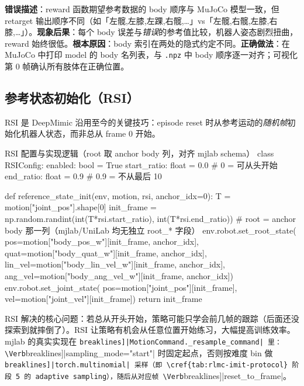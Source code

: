 \begin{pitfall}
\textbf{错误描述}：reward 函数期望参考数据的 body 顺序与 MuJoCo 模型一致，但 retarget 输出顺序不同（如「左髋,左膝,左踝,右髋,…」vs「左髋,右髋,左膝,右膝,…」）。\textbf{现象后果}：每个 body 误差与\emph{错误}的参考值比较，机器人姿态剧烈扭曲，reward 始终很低。\textbf{根本原因}：body 索引在两处的隐式约定不同。\textbf{正确做法}：在 MuJoCo 中打印 model 的 body 名列表，与 \texttt{.npz} 中 body 顺序逐一对齐；可视化第 0 帧确认所有肢体在正确位置。
\end{pitfall}

\subsection{参考状态初始化（RSI）}
\label{sec:rlmc-imit-track-rsi}

RSI 是 DeepMimic 沿用至今的关键技巧：episode reset 时从参考运动的\emph{随机帧}初始化机器人状态，而非总从 frame 0 开始。

\begin{codebox}[Python]{RSI 配置与实现逻辑（root 取 anchor body 列，对齐 mjlab schema）}
class RSIConfig:
    enabled: bool = True
    start_ratio: float = 0.0    # 0 = 可从头开始
    end_ratio: float = 0.9      # 0.9 = 不从最后 10%

def reference_state_init(env, motion, rsi, anchor_idx=0):
    T = motion["joint_pos"].shape[0]
    init_frame = np.random.randint(int(T*rsi.start_ratio), int(T*rsi.end_ratio))
    # root = anchor body 那一列（mjlab/UniLab 均无独立 root_* 字段）
    env.robot.set_root_state(
        pos=motion["body_pos_w"][init_frame, anchor_idx],
        quat=motion["body_quat_w"][init_frame, anchor_idx],
        lin_vel=motion["body_lin_vel_w"][init_frame, anchor_idx],
        ang_vel=motion["body_ang_vel_w"][init_frame, anchor_idx])
    env.robot.set_joint_state(
        pos=motion["joint_pos"][init_frame], vel=motion["joint_vel"][init_frame])
    return init_frame
\end{codebox}

RSI 解决的核心问题：若总从开头开始，策略可能只学会前几帧的跟踪（后面还没探索到就摔倒了）。RSI 让策略有机会从任意位置开始练习，大幅提高训练效率。mjlab 的真实实现在 \Verb[breaklines]|MotionCommand._resample_command| 里：\Verb[breaklines]|sampling_mode="start"| 时固定起点，否则按难度 bin 做 \Verb[breaklines]|torch.multinomial| 采样（即 \cref{tab:rlmc-imit-protocol} 阶段 5 的 adaptive sampling），随后从对应帧 \Verb[breaklines]|reset_to_frame|。

